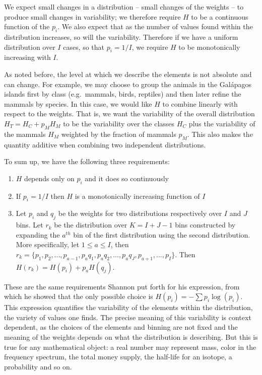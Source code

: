 \documentclass[iopart]{revtex4-1}
\begin{document}
We  expect small changes in a distribution -- small changes of the weights -- to produce small changes in variability; we therefore require $H$ to be a continuous function of the $p_i$. We also expect that as the number of values found within the distribution increases, so will the variability. Therefore if we have a uniform distribution over $I$ cases, so that $p_i = 1/I$, we require $H$ to be monotonically increasing with $I$.

As noted before, the level at which we describe the elements is not absolute and can change. For example, we may choose to group the animals in the Gal\'{a}pagos islands first by class (e.g.~mammals, birds, reptiles) and then later refine the mammals by species. In this case, we would like $H$ to combine linearly with respect to the weights. That is, we want the variability of the overall distribution $H_T = H_C + p_M H_M$ to be the variability over the classes $H_C$ plus the variability of the mammals $H_M$ weighted by the fraction of mammals $p_M$. This also makes the quantity additive when combining two independent distributions.

To sum up, we have the following three requirements:
\begin{enumerate}
\item $H$ depends only on $p_i$ and it does so continuously
\item If $p_i=1/I$ then $H$ is a monotonically increasing function of $I$
\item Let $p_i$ and $q_j$ be the weights for two distributions respectively over $I$ and $J$ bins. Let $r_k$ be the distribution over $K=I+J-1$ bins constructed by expanding the $a^{th}$ bin of the first distribution using the second distribution. More specifically, let $1 \leq a \leq I$, then $r_k = \{p_1, p_2, ..., p_{a-1}, p_{a}q_1, p_{a}q_2, ..., p_{a}q_J, p_{a+1}, ..., p_I \}$. Then $H(r_k) = H(p_i) + p_{a} H(q_j)$.
\end{enumerate}
These are the same requirements Shannon put forth for his expression\cite{Shannon}, from which he showed that the only possible choice is $H(p_i) = - \sum p_i \log(p_i)$. This expression quantifies the variability of the elements within the distribution, the variety of values one finds. The precise meaning of this variability is context dependent, as the choices of the elements and binning are not fixed and the meaning of the weights depends on what the distribution is describing. But this is true for any mathematical object: a real number may represent mass, color in the frequency spectrum, the total money supply, the half-life for an isotope, a probability and so on.
\end{document}
